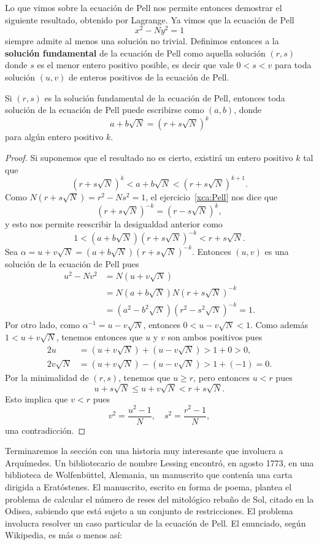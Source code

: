 Lo que vimos sobre la ecuación de Pell nos permite entonces demostrar el
siguiente resultado, obtenido por Lagrange. Ya vimos que la ecuación de Pell 
\[
	x^2-Ny^2=1
\]
siempre admite al menos una solución no trivial. Definimos
entonces a la \textbf{solución fundamental} de la ecuación de Pell como aquella
solución $(r,s)$ donde $s$ es el menor entero positivo posible, es
decir que vale $0<s<v$ para toda solución $(u,v)$ de enteros
positivos de la ecuación de Pell.

\begin{theorem}[Lagrange]
	Si $(r,s)$ es la solución fundamental de la ecuación de Pell, entonces toda
	solución de la ecuación de Pell
	puede escribirse como $(a,b)$, donde
	\[
		a+b\sqrt{N}=(r+s\sqrt{N})^k
	\]
	para algún entero positivo $k$. 
\end{theorem}

\begin{proof}
	Si suponemos que el resultado no es cierto, existirá un entero positivo $k$
	tal que
	\[
		(r+s\sqrt{N})^k<a+b\sqrt{N}<(r+s\sqrt{N})^{k+1}.
	\]
	Como $N(r+s\sqrt{N})=r^2-Ns^2=1$, el ejercicio~\ref{xca:Pell} nos 
	dice que 
	\[
		(r+s\sqrt{N})^{-k}=(r-s\sqrt{N})^k, 
	\]
	y esto nos permite reescribir la desigualdad anterior como
	\[
		1<(a+b\sqrt{N})(r+s\sqrt{N})^{-k}<r+s\sqrt{N}.
	\]
	Sea $\alpha=u+v\sqrt{N}=(a+b\sqrt{N})(r+s\sqrt{N})^{-k}$. Entonces
	$(u,v)$ es una solución de la ecuación de Pell
	pues 
	\begin{align*}
		u^2-Nv^2&=N(u+v\sqrt{N})\\
		&=N(a+b\sqrt{N})N(r+s\sqrt{N})^{-k}\\
		&=(a^2-b^2\sqrt{N})(r^2-s^2\sqrt{N})^{-k}=1.
	\end{align*}
	Por otro lado, como $\alpha^{-1}=u-v\sqrt{N}$, entonces $0<u-v\sqrt{N}<1$.
	Como además $1<u+v\sqrt{N}$, tenemos entonces que $u$ y $v$ son ambos
	positivos pues 
	\begin{align*}
		2u&=(u+v\sqrt{N})+(u-v\sqrt{N})>1+0>0,\\
		2v\sqrt{N}&=(u+v\sqrt{N})-(u-v\sqrt{N})>1+(-1)=0.
	\end{align*}
	Por la minimalidad de $(r,s)$, tenemos que $u\geq r$, pero entonces $u<r$ pues 
	\[
		u+s\sqrt{N}\leq u+v\sqrt{N}<r+s\sqrt{N}.
	\]
	Esto implica que $v<r$ pues 
	\[
		v^2=\frac{u^2-1}{N},\quad
		s^2=\frac{r^2-1}{N},
	\]
	una contradicción.
\end{proof}


Terminaremos la sección con una historia muy interesante
que involucra a Arquímedes. 
Un bibliotecario de nombre 
Lessing encontró, en agosto 1773, en una biblioteca 
de Wolfenbüttel, Alemania, un manuscrito que contenía una carta dirigida a
Eratóstenes. El manuscrito, escrito en forma de poema, plantea el
problema de calcular el número de reses del mitológico rebaño de Sol, citado en
la Odisea, sabiendo que está sujeto a un conjunto de restricciones.  El
problema involucra resolver un caso particular de la ecuación de
Pell. El enunciado, según Wikipedia, es más o menos así:

